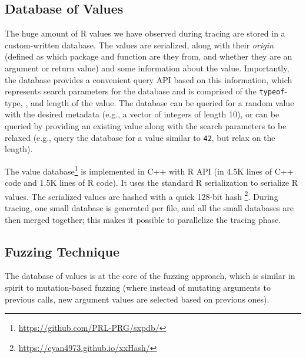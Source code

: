 \documentclass[sigplan,anonymous,review]{acmart}
\begin{document}

\subsection{Database of Values}

The huge amount of R values we have observed during tracing are stored in a custom-written database. 
The values are serialized, along with their \textit{origin} (defined as which package and function are they from, and whether they are an argument or return value) and some information about the value. %
Importantly, the database provides a convenient query API based on this information, which represents search parameters for the database and is comprised of the {\tt typeof}-type, , and length of the value. 
The database can be queried for a random value with the desired metadata (e.g., a vector of integers of length 10), or can be queried by providing an existing value along with the search parameters to be relaxed (e.g., query the database for a value similar to {\tt 42}, but relax on the length).

The value database\footnote{\url{https://github.com/PRL-PRG/sxpdb/}  } is implemented in C++ with R API (in 4.5K lines of C++ code and 1.5K lines of R code).
It uses the standard R serialization to serialize R values. 
The serialized values are hashed with a quick 128-bit hash \footnote{\url{https://cyan4973.github.io/xxHash/}}. 
During tracing, one small database is generated per file, and all the small databases are then merged together; this makes it possible to parallelize the tracing phase.

\subsection{Fuzzing Technique }

The database of values is at the core of the fuzzing approach, which is similar in spirit to mutation-based fuzzing (where instead of mutating arguments to previous calls, new argument values are selected based on previous ones).
\end{document}
